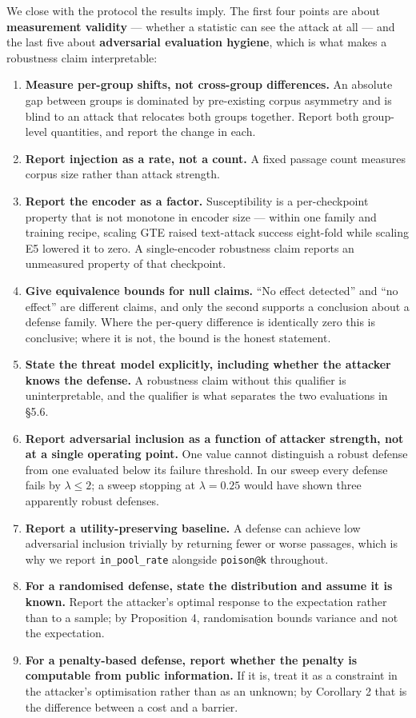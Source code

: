 \documentclass[authoryear,review,3p,times]{elsarticle}
\providecommand{\tightlist}{%
  \setlength{\itemsep}{0pt}\setlength{\parskip}{0pt}}
\begin{document}
We close with the protocol the results imply. The first four points are about \textbf{measurement validity} --- whether a statistic can see the attack at all --- and the last five about \textbf{adversarial evaluation hygiene}, which is what makes a robustness claim interpretable:

\begin{enumerate}
\def\labelenumi{\arabic{enumi}.}
\tightlist
\item
  \textbf{Measure per-group shifts, not cross-group differences.} An absolute gap between groups is dominated by pre-existing corpus asymmetry and is blind to an attack that relocates both groups together. Report both group-level quantities, and report the change in each.
\item
  \textbf{Report injection as a rate, not a count.} A fixed passage count measures corpus size rather than attack strength.
\item
  \textbf{Report the encoder as a factor.} Susceptibility is a per-checkpoint property that is not monotone in encoder size --- within one family and training recipe, scaling GTE raised text-attack success eight-fold while scaling E5 lowered it to zero. A single-encoder robustness claim reports an unmeasured property of that checkpoint.
\item
  \textbf{Give equivalence bounds for null claims.} ``No effect detected'' and ``no effect'' are different claims, and only the second supports a conclusion about a defense family. Where the per-query difference is identically zero this is conclusive; where it is not, the bound is the honest statement.
\item
  \textbf{State the threat model explicitly, including whether the attacker knows the defense.} A robustness claim without this qualifier is uninterpretable, and the qualifier is what separates the two evaluations in §5.6.
\item
  \textbf{Report adversarial inclusion as a function of attacker strength, not at a single operating point.} One value cannot distinguish a robust defense from one evaluated below its failure threshold. In our sweep every defense fails by \(\lambda \le 2\); a sweep stopping at \(\lambda = 0.25\) would have shown three apparently robust defenses.
\item
  \textbf{Report a utility-preserving baseline.} A defense can achieve low adversarial inclusion trivially by returning fewer or worse passages, which is why we report \texttt{in\_pool\_rate} alongside \texttt{poison@k} throughout.
\item
  \textbf{For a randomised defense, state the distribution and assume it is known.} Report the attacker's optimal response to the expectation rather than to a sample; by Proposition 4, randomisation bounds variance and not the expectation.
\item
  \textbf{For a penalty-based defense, report whether the penalty is computable from public information.} If it is, treat it as a constraint in the attacker's optimisation rather than as an unknown; by Corollary 2 that is the difference between a cost and a barrier.
\end{enumerate}
\end{document}
